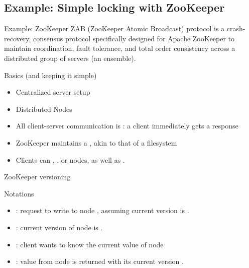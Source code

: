 \subsection{Example: Simple locking with ZooKeeper}
\begin{frame}{Example: ZooKeeper}
  ZAB (ZooKeeper Atomic Broadcast) protocol is a crash-recovery, consensus protocol specifically designed for Apache ZooKeeper to maintain coordination, fault tolerance, and total order consistency across a distributed group of servers (an ensemble).
  \begin{block}{Basics (and keeping it simple)}
    \begin{itemize}\firmlist
      \item Centralized server setup
      \item Distributed Nodes
      \item All client-server communication is : a client immediately gets a response
      \item ZooKeeper maintains a , akin to that of a filesystem
      \item Clients can , , or  nodes, as well as .
    \end{itemize}
  \end{block}
\end{frame}
\begin{frame}{ZooKeeper versioning}
  \begin{centerfig}
  \end{centerfig}

  \begin{block}{Notations}
    \begin{itemize}\firmlist
      \item {}: request to write  to node , assuming current version is .
      \item {}: current version of node  is .
      \item {}: client wants to know the current value of node 
      \item {}: value  from node  is returned with its current version .
    \end{itemize}
  \end{block}
\end{frame}
